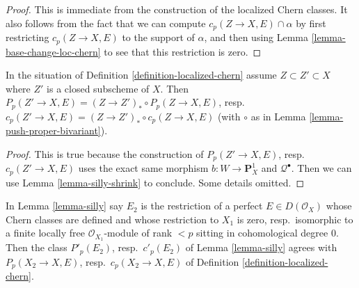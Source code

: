 \begin{proof}
This is immediate from the construction of the localized Chern classes.
It also follows from the fact that we can compute
$c_p(Z \to X, E) \cap \alpha$ by first restricting $c_p(Z \to X, E)$ to
the support of $\alpha$, and then using Lemma \ref{lemma-base-change-loc-chern}
to see that this restriction is zero.
\end{proof}

\begin{lemma}
\label{lemma-loc-chern-shrink-Z}
In the situation of Definition \ref{definition-localized-chern}
assume $Z \subset Z' \subset X$ where $Z'$ is a closed subscheme of $X$.
Then
$P_p(Z' \to X, E) = (Z \to Z')_* \circ P_p(Z \to X, E)$,
resp.\ $c_p(Z' \to X, E) = (Z \to Z')_* \circ c_p(Z \to X, E)$
(with $\circ$ as in Lemma \ref{lemma-push-proper-bivariant}).
\end{lemma}

\begin{proof}
This is true because the construction of
$P_p(Z' \to X, E)$, resp.\ $c_p(Z' \to X, E)$
uses the exact same morphism $b : W \to \mathbf{P}^1_X$
and $\mathcal{Q}^\bullet$. Then we can use
Lemma \ref{lemma-silly-shrink} to conclude.
Some details omitted.
\end{proof}

\begin{lemma}
\label{lemma-loc-chern-agree}
In Lemma \ref{lemma-silly} say $E_2$ is the restriction of a perfect
$E \in D(\mathcal{O}_X)$ whose Chern classes are defined and
whose restriction to $X_1$ is zero, resp.\ isomorphic to a
finite locally free $\mathcal{O}_{X_1}$-module
of rank $< p$ sitting in cohomological degree $0$. Then the
class $P'_p(E_2)$, resp.\ $c'_p(E_2)$ of Lemma \ref{lemma-silly} agrees with
$P_p(X_2 \to X, E)$, resp.\ $c_p(X_2 \to X, E)$ of
Definition \ref{definition-localized-chern}.
\end{lemma}

